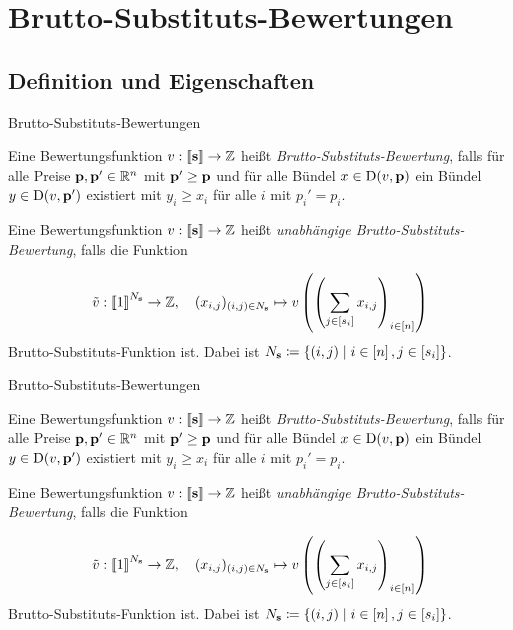\section{Brutto-Substituts-Bewertungen}
\newcommand{\tild}[1]{\widetile{#1}}
\subsection{Definition und Eigenschaften}
\begin{frame}{Brutto-Substituts-Bewertungen}
	\begin{definition}
		Eine Bewertungsfunktion $v: \left\llbracket \mathbf{s} \right\rrbracket \rightarrow \mathbb{Z}$ heißt \emph{Brutto-Substituts-Bewertung},
		falls für alle Preise $\mathbf{p},\mathbf{p}'\in\mathbb{R}^n$ mit $\mathbf{p}' \geq \mathbf{p}$ und für alle Bündel $x\in\operatorname{D}(v, \mathbf{p})$ ein Bündel $y\in\operatorname{D}(v,\mathbf{p}')$ existiert mit $y_i \geq x_i$ für alle $i$ mit $p_i' = p_i$.
		
		\pause\vspace{1em}
		
		\parbox{\textwidth}{Eine Bewertungsfunktion $v:\left\llbracket \mathbf{s} \right\rrbracket \rightarrow \mathbb{Z}$ heißt \emph{unabhängige Brutto-Substituts-Bewertung}, falls die Funktion}
		\[
		\tilde{v}:\left\llbracket 1 \right\rrbracket^{N_{\mathbf{s}}} \rightarrow \mathbb{Z}, \quad (x_{i,j})_{(i,j)\in N_{\mathbf{s}}} \mapsto v \left( \left( \sum_{j\in\left[ s_i \right]} x_{i,j} \right)_{i\in\left[ n \right]} \right)
		\]
		Brutto-Substituts-Funktion ist.
		Dabei ist $N_{\mathbf{s}} \coloneqq \{ (i,j) \mid i\in\left[ n \right], j\in\left[ s_i \right] \}$.
	\end{definition}
\end{frame}


\begin{frame}{Brutto-Substituts-Bewertungen}
\begin{definition}
Eine Bewertungsfunktion $v: \left\llbracket \mathbf{s} \right\rrbracket \rightarrow \mathbb{Z}$ heißt \emph{Brutto-Substituts-Bewertung},
falls für alle Preise $\mathbf{p},\mathbf{p}'\in\mathbb{R}^n$ mit $\mathbf{p}' \geq \mathbf{p}$ und für alle Bündel $x\in\operatorname{D}(v, \mathbf{p})$ ein Bündel $y\in\operatorname{D}(v,\mathbf{p}')$ existiert mit $y_i \geq x_i$ für alle $i$ mit $p_i' = p_i$.

\pause\vspace{1em}

\parbox{\textwidth}{Eine Bewertungsfunktion $v:\left\llbracket \mathbf{s} \right\rrbracket \rightarrow \mathbb{Z}$ heißt \emph{unabhängige Brutto-Substituts-Bewertung}, falls die Funktion}
\[
\tilde{v}:\left\llbracket 1 \right\rrbracket^{N_{\mathbf{s}}} \rightarrow \mathbb{Z}, \quad (x_{i,j})_{(i,j)\in N_{\mathbf{s}}} \mapsto v \left( \left( \sum_{j\in\left[ s_i \right]} x_{i,j} \right)_{i\in\left[ n \right]} \right)
\]
Brutto-Substituts-Funktion ist.
Dabei ist $N_{\mathbf{s}} \coloneqq \{ (i,j) \mid i\in\left[ n \right], j\in\left[ s_i \right] \}$.
\end{definition}
\end{frame}

